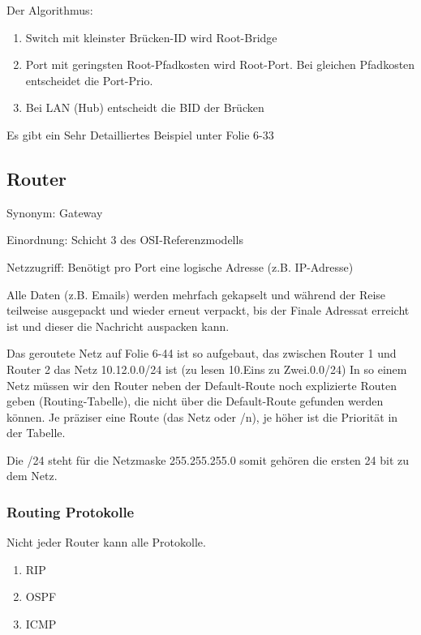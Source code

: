 \documentclass[a4paper]{article}
\begin{document}
Der Algorithmus:

\begin{enumerate}
    \item Switch mit kleinster Brücken-ID wird Root-Bridge
    \item Port mit geringsten Root-Pfadkosten wird Root-Port. Bei gleichen Pfadkosten entscheidet die Port-Prio.
    \item Bei LAN (Hub) entscheidt die BID der Brücken
\end{enumerate}

Es gibt ein Sehr Detailliertes Beispiel unter Folie 6-33


\subsection{Router}


Synonym: Gateway

Einordnung: Schicht 3 des OSI-Referenzmodells

Netzzugriff: Benötigt pro Port eine logische Adresse (z.B. IP-Adresse)

Alle Daten (z.B. Emails) werden mehrfach gekapselt und während der Reise teilweise ausgepackt und wieder erneut verpackt, bis der Finale Adressat erreicht ist und dieser die Nachricht auspacken kann.

Das geroutete Netz auf Folie 6-44 ist so aufgebaut, das zwischen Router 1 und Router 2 das Netz 10.12.0.0/24 ist (zu lesen 10.Eins zu Zwei.0.0/24) In so einem Netz müssen wir den Router neben der Default-Route noch explizierte Routen geben (Routing-Tabelle), die nicht über die Default-Route gefunden werden können. Je präziser eine Route (das Netz oder /n), je höher ist die Priorität in der Tabelle.

Die /24 steht für die Netzmaske 255.255.255.0 somit gehören die ersten 24 bit zu dem Netz.

\subsubsection{Routing Protokolle}


Nicht jeder Router kann alle Protokolle.

\begin{enumerate}
    \item RIP
    \item OSPF
    \item ICMP
\end{enumerate}
\end{document}
